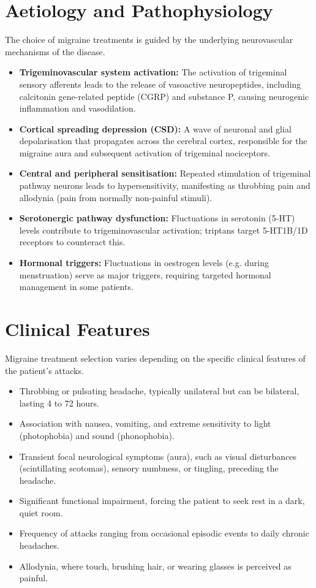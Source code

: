 \section*{Aetiology and Pathophysiology}
The choice of migraine treatments is guided by the underlying neurovascular mechanisms of the disease.
\begin{itemize}
    \item \textbf{Trigeminovascular system activation:} The activation of trigeminal sensory afferents leads to the release of vasoactive neuropeptides, including calcitonin gene-related peptide (CGRP) and substance P, causing neurogenic inflammation and vasodilation.
    \item \textbf{Cortical spreading depression (CSD):} A wave of neuronal and glial depolarisation that propagates across the cerebral cortex, responsible for the migraine aura and subsequent activation of trigeminal nociceptors.
    \item \textbf{Central and peripheral sensitisation:} Repeated stimulation of trigeminal pathway neurons leads to hypersensitivity, manifesting as throbbing pain and allodynia (pain from normally non-painful stimuli).
    \item \textbf{Serotonergic pathway dysfunction:} Fluctuations in serotonin (5-HT) levels contribute to trigeminovascular activation; triptans target 5-HT1B/1D receptors to counteract this.
    \item \textbf{Hormonal triggers:} Fluctuations in oestrogen levels (e.g. during menstruation) serve as major triggers, requiring targeted hormonal management in some patients.
\end{itemize}

\section*{Clinical Features}
Migraine treatment selection varies depending on the specific clinical features of the patient's attacks.
\begin{itemize}
    \item Throbbing or pulsating headache, typically unilateral but can be bilateral, lasting 4 to 72 hours.
    \item Association with nausea, vomiting, and extreme sensitivity to light (photophobia) and sound (phonophobia).
    \item Transient focal neurological symptoms (aura), such as visual disturbances (scintillating scotomas), sensory numbness, or tingling, preceding the headache.
    \item Significant functional impairment, forcing the patient to seek rest in a dark, quiet room.
    \item Frequency of attacks ranging from occasional episodic events to daily chronic headaches.
    \item Allodynia, where touch, brushing hair, or wearing glasses is perceived as painful.
\end{itemize}

